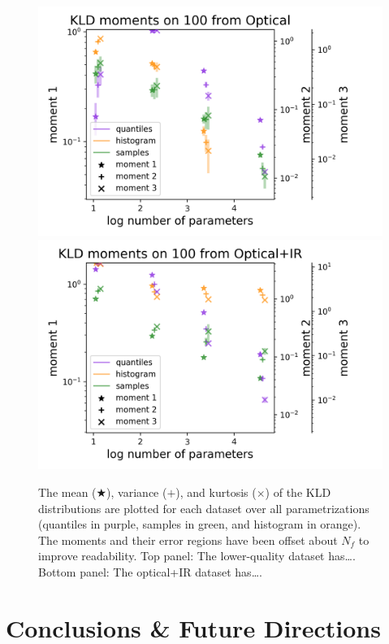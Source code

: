\documentclass[\docopts]{\docclass}
\begin{document}
\begin{figure}
  \includegraphics[width=0.9\columnwidth]{lsst_moments.png}\\
  \includegraphics[width=0.9\columnwidth]{euclid_moments.png}
  \caption{The mean ($\bigstar$), variance ($+$), and kurtosis ($\times$) of 
the KLD distributions are plotted for each dataset over all parametrizations 
(quantiles in purple, samples in green, and histogram in orange).  The moments 
and their error regions have been offset about $N_{f}$ to improve readability.  
Top panel: The lower-quality dataset has\dots.  Bottom panel: The optical+IR 
dataset has\dots.
  \label{fig:moments}}
\end{figure}







\section{Conclusions \& Future Directions}
\label{sec:conclusions}
\end{document}
